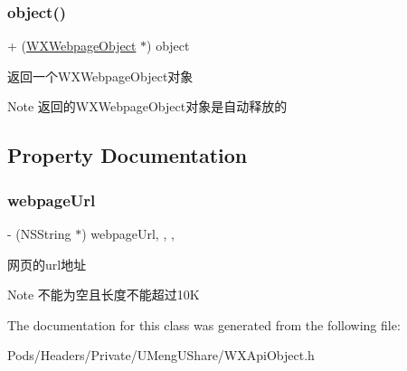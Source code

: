 \subsubsection{\texorpdfstring{object()}{object()}\hspace{0.1cm}{\footnotesize\ttfamily [3/3]}}
{\footnotesize\ttfamily + (\mbox{\hyperlink{interface_w_x_webpage_object}{W\+X\+Webpage\+Object}} $\ast$) object \begin{DoxyParamCaption}{ }\end{DoxyParamCaption}}



返回一个\+W\+X\+Webpage\+Object对象 

\begin{DoxyNote}{Note}
返回的\+W\+X\+Webpage\+Object对象是自动释放的 
\end{DoxyNote}


\subsection{Property Documentation}
\mbox{\label{interface_w_x_webpage_object_ad0377d01e42d37af1540a68815888d5c}} 
\subsubsection{\texorpdfstring{webpage\+Url}{webpageUrl}}
{\footnotesize\ttfamily -\/ (N\+S\+String $\ast$) webpage\+Url\hspace{0.3cm}{\ttfamily [read]}, {\ttfamily [write]}, {\ttfamily [nonatomic]}, {\ttfamily [retain]}}

网页的url地址 \begin{DoxyNote}{Note}
不能为空且长度不能超过10K 
\end{DoxyNote}


The documentation for this class was generated from the following file\+:\begin{DoxyCompactItemize}
\item 
Pods/\+Headers/\+Private/\+U\+Meng\+U\+Share/W\+X\+Api\+Object.\+h\end{DoxyCompactItemize}
